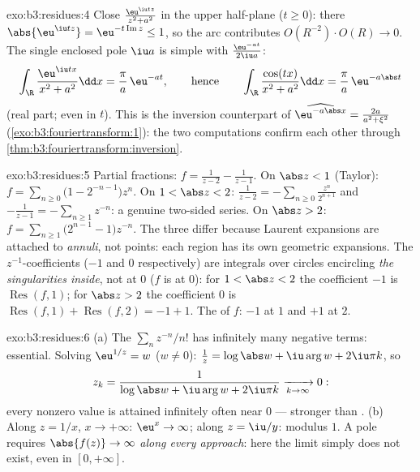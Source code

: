 \begin{solution}{exo:b3:residues:4}
Close $\frac{\eu^{\iu tz}}{z^2 + a^2}$ in the upper half-plane
($t \geq 0$): there $\abs{\eu^{\iu tz}} =
\eu^{-t\operatorname{Im}z} \leq 1$, so the arc contributes
$O(R^{-2})\cdot O(R) \to 0$. The single enclosed pole $\iu a$
is simple with  $\frac{\eu^{-at}}{2\iu a}$:
\[
\int_\R\frac{\eu^{\iu tx}}{x^2 + a^2}\dd x =
\frac{\pi}{a}\,\eu^{-at},
\qquad\text{hence}\qquad
\int_\R\frac{\cos(tx)}{x^2+a^2}\dd x = \frac\pi
a\,\eu^{-a\abs t}
\]
(real part; even in $t$). This is the inversion counterpart
of $\widehat{\eu^{-a\abs x}} = \frac{2a}{a^2+\xi^2}$
(\cref{exo:b3:fouriertransform:1}): the two computations
confirm each other through
\cref{thm:b3:fouriertransform:inversion}.
\end{solution}

\begin{solution}{exo:b3:residues:5}
Partial fractions: $f = \frac1{z-2} - \frac1{z-1}$.
On $\abs z < 1$ (Taylor):
$f = \sum_{n\geq0}\bigl(1 - 2^{-n-1}\bigr)z^n$.
On $1 < \abs z < 2$: $\frac1{z-2} =
-\sum_{n\geq0}\frac{z^n}{2^{n+1}}$ and $-\frac1{z-1} =
-\sum_{n\geq1}z^{-n}$: a genuine two-sided series.
On $\abs z > 2$: $f = \sum_{n\geq1}\bigl(2^{n-1} -
1\bigr)z^{-n}$. The three differ because Laurent expansions
are attached to \emph{annuli}, not points: each region has its
own geometric expansions. The $z^{-1}$-coefficients ($-1$ and
$0$ respectively) are integrals over circles encircling
\emph{the singularities inside}, not  at $0$ ($f$ is
 at $0$): for $1 < \abs z < 2$ the coefficient
$-1$ is $\operatorname{Res}(f, 1)$; for $\abs z > 2$ the
coefficient $0$ is $\operatorname{Res}(f,1) +
\operatorname{Res}(f,2) = -1 + 1$. The  of $f$: $-1$
at $1$ and $+1$ at $2$.
\end{solution}

\begin{solution}{exo:b3:residues:6}
(a) The  $\sum_nz^{-n}/n!$ has infinitely many
negative terms: essential. Solving $\eu^{1/z} = w$ ($w \neq
0$): $\frac1z = \log\abs w + \iu\arg w + 2\iu\pi k$, so
\[
z_k = \frac1{\log\abs w + \iu\arg w + 2\iu\pi k}
\xrightarrow[k\to\infty]{} 0 :
\]
every nonzero value is attained infinitely often near $0$ ---
stronger than .
(b) Along $z = 1/x$, $x \to +\infty$: $\eu^x \to \infty$;
along $z = \iu/y$: modulus $1$. A pole requires
$\abs{f(z)} \to \infty$ \emph{along every approach}: here the
limit simply does not exist, even in $[0, +\infty]$.
\end{solution}

